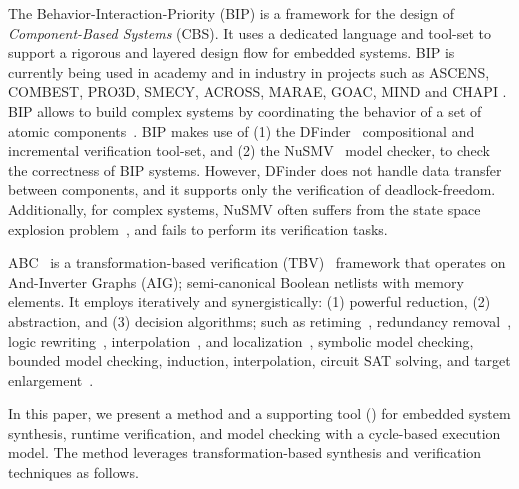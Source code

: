 The Behavior-Interaction-Priority (BIP) is a framework for the design of 
{\em Component-Based Systems} (CBS). 
It uses a dedicated language and tool-set to support a rigorous 
and layered design flow for embedded systems. 
BIP is currently being used in academy and in industry in projects such as 
ASCENS, COMBEST, PRO3D, SMECY, ACROSS, MARAE, GOAC, MIND and CHAPI \cite{bipwebsite}. 
BIP allows to build complex systems by coordinating the behavior of a set of 
atomic components~\cite{bip11}.
BIP makes use of (1) the DFinder~\cite{dfinder} compositional  
and incremental verification tool-set, and (2) the NuSMV~\cite{nusmv} model checker, 
to check the correctness of BIP systems. 
However, DFinder \cite{BBL14} does not handle data transfer between components, 
and it supports only the verification of deadlock-freedom. 
Additionally, for complex systems, NuSMV often suffers from the state space explosion 
problem~\cite{sipser2006introduction}, and fails to perform its verification tasks.

ABC~\cite{brayton2010abc} is a transformation-based 
verification (TBV)~\cite{KuBa01} framework that operates on 
And-Inverter Graphs (AIG); semi-canonical Boolean netlists with
memory elements. It employs iteratively and synergistically: (1) powerful reduction, (2) abstraction, and (3) decision algorithms; such as
retiming~\cite{KuBa01}, 
redundancy removal~\cite{HmBPK05,KuMP01,BjesseC00,aziz-fmsd-00}, 
logic rewriting~\cite{BjBo04}, interpolation~\cite{McMillan03}, 
and localization~\cite{Wang03}, 
symbolic model checking, bounded model checking, induction, 
interpolation, circuit SAT solving, 
and target enlargement~\cite{MoGS00,MoMZ01,HoSH00,BaKuAb02,Hari05expert}.

In this paper, we present a method and a supporting tool (\biptool)
for embedded system synthesis, runtime verification,
and model checking with a cycle-based execution model.
The method leverages transformation-based synthesis and verification techniques 
as follows. 

